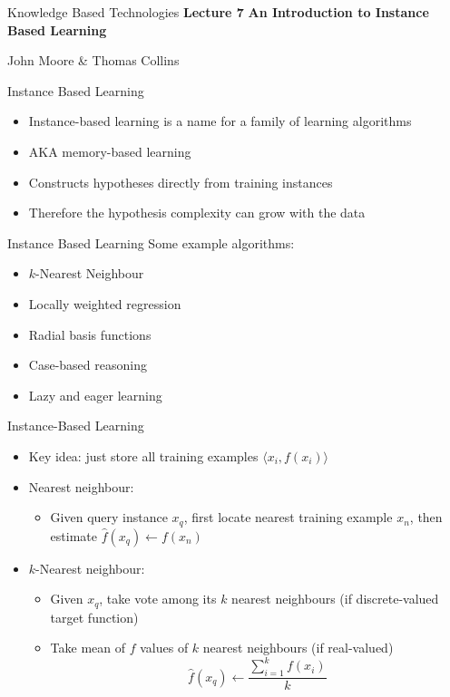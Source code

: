 \documentclass[%
pdf,
colorBG,
slideColor,
tcrico,
]{prosper}
\begin{document}
\begin{slide}{Knowledge Based Technologies}
	\textbf{Lecture 7} 
	\newline
	\textbf{An Introduction to Instance Based Learning}

	\small
	John Moore \& Thomas Collins
\end{slide}

\begin{slide}{Instance Based Learning}
\begin{itemize}
\item Instance-based learning is a name for a family of learning algorithms
\item AKA memory-based learning
\item Constructs hypotheses directly from training instances
\item Therefore the hypothesis complexity can grow with the data
\end{itemize}
\end{slide}


\begin{slide}{Instance Based Learning}
Some example algorithms:
\begin{itemize}
\item $k$-Nearest Neighbour
\item Locally weighted regression
\item Radial basis functions
\item Case-based reasoning
\item Lazy and eager learning
\end{itemize}
\end{slide}


\begin{slide}{Instance-Based Learning }
\begin{itemize}
 \item  Key idea: just store all training examples $\langle x_i, f(x_i) \rangle$
\item  Nearest neighbour:
	\begin{itemize}
	\item
	Given query instance $x_q$, first locate nearest training example $x_n$, then
	estimate $\hat{f}(x_q) \leftarrow f(x_n)$
	\end{itemize}
\item $k$-Nearest neighbour:
	\begin{itemize}
	\item Given $x_q$, take vote among its $k$ nearest neighbours (if discrete-valued
	target function)
	\item Take mean of $f$ values of $k$ nearest neighbours (if real-valued)
	\[ \hat{f}(x_{q}) \leftarrow  \frac{\sum_{i=1}^{k}f(x_{i})}{k} \]
	\end{itemize}
\end{itemize}
\end{slide}
\end{document}
